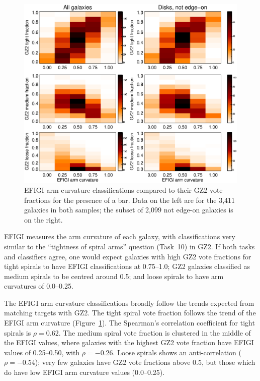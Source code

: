 \documentclass[useAMS,usenatbib]{mn2e}
\begin{document}
\begin{figure}
\includegraphics[angle=0,width=7.0in]{figures/efigi_arm_curvature.eps}
\caption{EFIGI arm curvature classifications compared to their GZ2 vote fractions for the presence of a bar. Data on the left are for the 3,411 galaxies in both samples; the subset of 2,099 not edge-on galaxies is on the right.  
\label{fig-efigi_arms}}
\end{figure}

EFIGI measures the arm curvature of each galaxy, with classifications very similar to the ``tightness of spiral arms'' question (Task~10) in GZ2. If both tasks and classifiers agree, one would expect galaxies with high GZ2 vote fractions for tight spirals to have EFIGI classifications at 0.75--1.0; GZ2 galaxies classified as medium spirals to be centred around 0.5; and loose spirals to have arm curvatures of 0.0--0.25. 

The EFIGI arm curvature classifications broadly follow the trends expected from matching targets with GZ2. The tight spiral vote fraction follows the trend of the EFIGI arm curvature (Figure~\ref{fig-efigi_arms}). The Spearman's correlation coefficient for tight spirals is $\rho=0.62$. The medium spiral vote fraction is clustered in the middle of the EFIGI values, where galaxies with the highest GZ2 vote fraction have EFIGI values of 0.25--0.50, with $\rho=-0.26$. Loose spirals shows an anti-correlation ($\rho=-0.54$); very few galaxies have GZ2 vote fractions above 0.5, but those which do have low EFIGI arm curvature values (0.0--0.25). 
\end{document}
